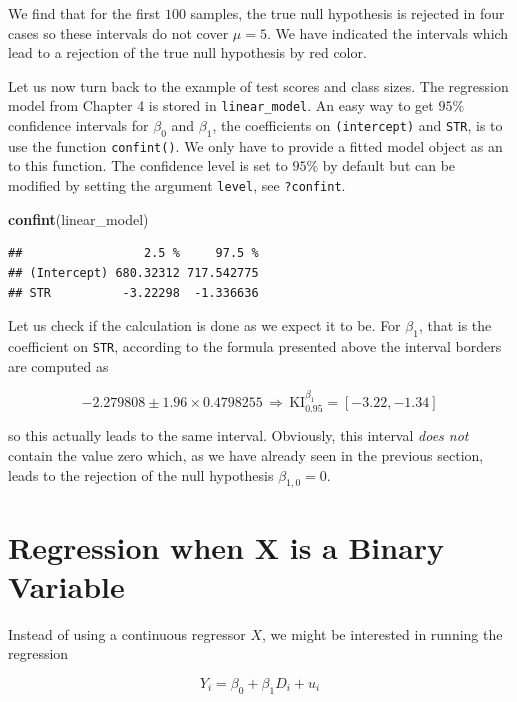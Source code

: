 \documentclass[]{book}
\newenvironment{Shaded}{\begin{snugshade}}{\end{snugshade}}
\newcommand{\KeywordTok}[1]{\textcolor[rgb]{0.13,0.29,0.53}{\textbf{#1}}}
\newcommand{\NormalTok}[1]{#1}
\theoremstyle{definition}
\theoremstyle{definition}
\theoremstyle{definition}
\theoremstyle{remark}
\begin{document}
We find that for the first \(100\) samples, the true null hypothesis is
rejected in four cases so these intervals do not cover \(\mu=5\). We
have indicated the intervals which lead to a rejection of the true null
hypothesis by red color.

Let us now turn back to the example of test scores and class sizes. The
regression model from Chapter 4 is stored in \texttt{linear\_model}. An
easy way to get \(95\%\) confidence intervals for \(\beta_0\) and
\(\beta_1\), the coefficients on \texttt{(intercept)} and \texttt{STR},
is to use the function \texttt{confint()}. We only have to provide a
fitted model object as an to this function. The confidence level is set
to \(95\%\) by default but can be modified by setting the argument
\texttt{level}, see \texttt{?confint}.

\begin{Shaded}
\begin{Highlighting}[]
\KeywordTok{confint}\NormalTok{(linear_model)}
\end{Highlighting}
\end{Shaded}

\begin{verbatim}
##                 2.5 %     97.5 %
## (Intercept) 680.32312 717.542775
## STR          -3.22298  -1.336636
\end{verbatim}

Let us check if the calculation is done as we expect it to be. For
\(\beta_1\), that is the coefficient on \texttt{STR}, according to the
formula presented above the interval borders are computed as

\[  -2.279808 \pm 1.96 \times 0.4798255 \, \Rightarrow \, \text{KI}_{0.95}^{\beta_1} = \left[ -3.22, -1.34 \right]  \]

so this actually leads to the same interval. Obviously, this interval
\emph{does not} contain the value zero which, as we have already seen in
the previous section, leads to the rejection of the null hypothesis
\(\beta_{1,0} = 0\).

\section{Regression when X is a Binary
Variable}\label{regression-when-x-is-a-binary-variable}

Instead of using a continuous regressor \(X\), we might be interested in
running the regression

\[ Y_i = \beta_0 + \beta_1 D_i + u_i \tag{5.2} \]
\end{document}
